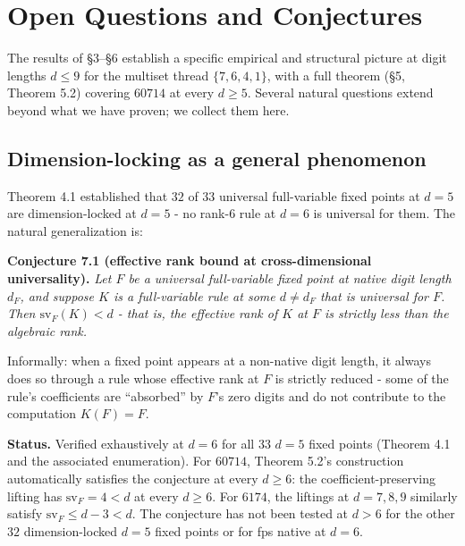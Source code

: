 \documentclass[11pt,letterpaper]{article}
\theoremstyle{paperstyle}
\theoremstyle{paperstyledef}
\theoremstyle{paperstylerem}
\begin{document}
\hypertarget{open-questions-and-conjectures}{%
\section{Open Questions and Conjectures}\label{open-questions-and-conjectures}}

The results of §3--§6 establish a specific empirical and structural
picture at digit lengths \(d \leq 9\) for the multiset thread
\(\{7, 6, 4, 1\}\), with a full theorem (§5, Theorem 5.2) covering
\(60714\) at every \(d \geq 5\). Several natural questions extend beyond
what we have proven; we collect them here.

\hypertarget{dimension-locking-as-a-general-phenomenon}{%
\subsection{Dimension-locking as a general phenomenon}\label{dimension-locking-as-a-general-phenomenon}}

Theorem 4.1 established that \(32\) of \(33\) universal full-variable
fixed points at \(d = 5\) are dimension-locked at \(d = 5\) - no
rank-\(6\) rule at \(d = 6\) is universal for them. The natural
generalization is:

\textbf{Conjecture 7.1 (effective rank bound at cross-dimensional
universality).} \emph{Let \(F\) be a universal full-variable fixed point
at native digit length \(d_F\), and suppose \(K\) is a full-variable
rule at some \(d \neq d_F\) that is universal for \(F\). Then
\(\mathrm{sv}_F(K) < d\) - that is, the effective rank of \(K\) at
\(F\) is strictly less than the algebraic rank.}

Informally: when a fixed point appears at a non-native digit length, it
always does so through a rule whose effective rank at \(F\) is strictly
reduced - some of the rule's coefficients are ``absorbed'' by \(F\)'s
zero digits and do not contribute to the computation \(K(F) = F\).

\textbf{Status.} Verified exhaustively at \(d = 6\) for all \(33\)
\(d = 5\) fixed points (Theorem 4.1 and the associated enumeration). For
\(60714\), Theorem 5.2's construction automatically satisfies the
conjecture at every \(d \geq 6\): the coefficient-preserving lifting has
\(\mathrm{sv}_F = 4 < d\) at every \(d \geq 6\). For \(6174\), the
liftings at \(d = 7, 8, 9\) similarly satisfy
\(\mathrm{sv}_F \leq d - 3 < d\). The conjecture has not been tested at
\(d > 6\) for the other \(32\) dimension-locked \(d = 5\) fixed points
or for fps native at \(d = 6\).
\end{document}
